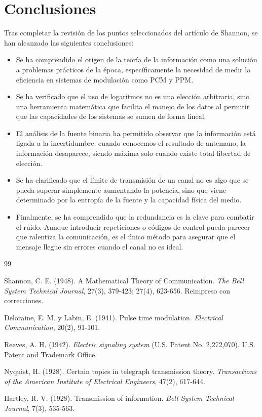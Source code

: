 \documentclass[11pt,a4paper,spanish]{book}
\begin{document}
\chapter{Conclusiones}

Tras completar la revisión de los puntos seleccionados del artículo de Shannon, se han alcanzado las siguientes conclusiones:

\begin{itemize}
    \item Se ha comprendido el origen de la teoría de la información como una solución a problemas prácticos de la época, específicamente la necesidad de medir la eficiencia en sistemas de modulación como PCM y PPM.
    \item Se ha verificado que el uso de logaritmos no es una elección arbitraria, sino una herramienta matemática que facilita el manejo de los datos al permitir que las capacidades de los sistemas se sumen de forma lineal.
    \item El análisis de la fuente binaria ha permitido observar que la información está ligada a la incertidumbre; cuando conocemos el resultado de antemano, la información desaparece, siendo máxima solo cuando existe total libertad de elección.
    \item Se ha clarificado que el límite de transmisión de un canal no es algo que se pueda superar simplemente aumentando la potencia, sino que viene determinado por la entropía de la fuente y la capacidad física del medio.
    \item Finalmente, se ha comprendido que la redundancia es la clave para combatir el ruido. Aunque introducir repeticiones o códigos de control pueda parecer que ralentiza la comunicación, es el único método para asegurar que el mensaje llegue sin errores cuando el canal no es ideal.
\end{itemize}\begin{thebibliography}{99}

Shannon, C. E. (1948). A Mathematical Theory of Communication. \emph{The Bell System Technical Journal}, 27(3), 379-423; 27(4), 623-656. Reimpreso con correcciones.

Deloraine, E. M. y Labin, E. (1941). Pulse time modulation. \emph{Electrical Communication}, 20(2), 91-101.

Reeves, A. H. (1942). \emph{Electric signaling system} (U.S. Patent No. 2,272,070). U.S. Patent and Trademark Office.

Nyquist, H. (1928). Certain topics in telegraph transmission theory. \emph{Transactions of the American Institute of Electrical Engineers}, 47(2), 617-644.

Hartley, R. V. (1928). Transmission of information. \emph{Bell System Technical Journal}, 7(3), 535-563.

\end{thebibliography}

% 
%
\end{document}
